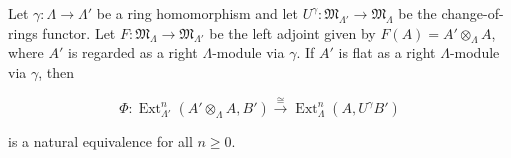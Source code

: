 Let $\gamma : \Lambda \rightarrow \Lambda'$ be a ring homomorphism and let $U^\gamma : \mathfrak{M}_{\Lambda'} \rightarrow \mathfrak{M}_\Lambda$ be the change-of-rings functor. Let $F : \mathfrak{M}_\Lambda \rightarrow \mathfrak{M}_{\Lambda'}$ be the left adjoint given by $F(A) = A' \otimes_\Lambda A$, where $A'$ is regarded as a right $\Lambda$-module via $\gamma$. If $A'$ is flat as a right $\Lambda$-module via $\gamma$, then

$$\Phi : \operatorname{Ext}_{\Lambda'}^n(A' \otimes_\Lambda A, B') \xrightarrow{\cong} \operatorname{Ext}_\Lambda^n(A, U^\gamma B')$$

is a natural equivalence for all $n \geq 0$.
